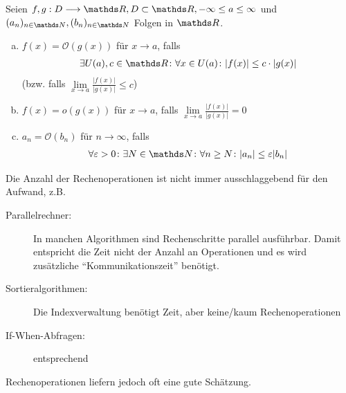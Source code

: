 \begin{Defe}
  Seien $f,g : D\longrightarrow \R, D\subset \R, -\infty\leq a\leq \infty$ und
  $(a_n)_{n\in\N}, (b_n)_{n\in\N}$ Folgen in $\R$.
  \begin{enumerate}[a)]
  \item $f(x) = \mathcal{O}(g(x))$ für $x\longrightarrow a$, falls
    \begin{gather*}
      \exists U(a),c\in\R\colon\forall x\in U(a)\colon |f(x)|\leq c\cdot |g(x)|
    \end{gather*}
    (bzw. falls $\lim\limits_{x\to a}\frac{|f(x)|}{|g(x)|} \leq c$)
  \item $f(x) = o(g(x))$ für $x\longrightarrow a$, falls 
    $\lim\limits_{x\rightarrow a}\frac{|f(x)|}{|g(x)|} = 0$
  \item $a_n = \mathcal{O}(b_n)$ für $n\longrightarrow \infty$, falls
    \begin{gather*}
      \forall\varepsilon>0\colon\exists N\in\N\colon
      \forall n\geq N\colon|a_n|\leq\varepsilon |b_n|
    \end{gather*}
  \end{enumerate}
\end{Defe}

Die Anzahl der Rechenoperationen ist nicht immer ausschlaggebend für
den Aufwand, z.B.
\begin{description}
\item[Parallelrechner:] 
  In manchen Algorithmen sind Rechenschritte parallel ausführbar.
  Damit entspricht die Zeit nicht der Anzahl an Operationen und es wird zusätzliche
  \enquote{Kommunikationszeit} benötigt.
\item[Sortieralgorithmen:] Die Indexverwaltung benötigt Zeit, aber keine/kaum Rechenoperationen
\item[If-When-Abfragen:] entsprechend
\end{description}
Rechenoperationen liefern jedoch oft eine gute Schätzung.


